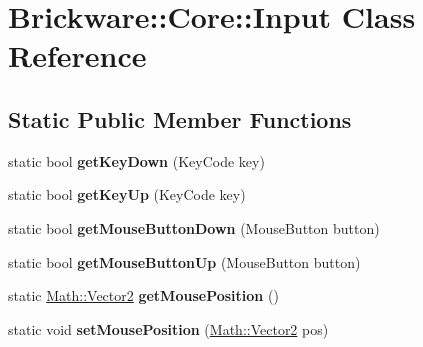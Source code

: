 \hypertarget{classBrickware_1_1Core_1_1Input}{}\section{Brickware\+:\+:Core\+:\+:Input Class Reference}
\label{classBrickware_1_1Core_1_1Input}
\subsection*{Static Public Member Functions}
\begin{DoxyCompactItemize}
\item 
\hypertarget{classBrickware_1_1Core_1_1Input_ab009d6745d772078e0f19ea9720d61b7}{}static bool {\bfseries get\+Key\+Down} (Key\+Code key)\label{classBrickware_1_1Core_1_1Input_ab009d6745d772078e0f19ea9720d61b7}

\item 
\hypertarget{classBrickware_1_1Core_1_1Input_acadd3c6ef414d2826d9e0a0cc05f0926}{}static bool {\bfseries get\+Key\+Up} (Key\+Code key)\label{classBrickware_1_1Core_1_1Input_acadd3c6ef414d2826d9e0a0cc05f0926}

\item 
\hypertarget{classBrickware_1_1Core_1_1Input_af6bb3c6985cdb2646f82bec45f010880}{}static bool {\bfseries get\+Mouse\+Button\+Down} (Mouse\+Button button)\label{classBrickware_1_1Core_1_1Input_af6bb3c6985cdb2646f82bec45f010880}

\item 
\hypertarget{classBrickware_1_1Core_1_1Input_a6db20f0ba2dcd158a210eea12e04ff79}{}static bool {\bfseries get\+Mouse\+Button\+Up} (Mouse\+Button button)\label{classBrickware_1_1Core_1_1Input_a6db20f0ba2dcd158a210eea12e04ff79}

\item 
\hypertarget{classBrickware_1_1Core_1_1Input_ada65d73a18226652a1b8330addf35e8a}{}static \hyperlink{classBrickware_1_1Math_1_1Vector2}{Math\+::\+Vector2} {\bfseries get\+Mouse\+Position} ()\label{classBrickware_1_1Core_1_1Input_ada65d73a18226652a1b8330addf35e8a}

\item 
\hypertarget{classBrickware_1_1Core_1_1Input_ac75abf7b5550242bac09cf2831720d48}{}static void {\bfseries set\+Mouse\+Position} (\hyperlink{classBrickware_1_1Math_1_1Vector2}{Math\+::\+Vector2} pos)\label{classBrickware_1_1Core_1_1Input_ac75abf7b5550242bac09cf2831720d48}

\end{DoxyCompactItemize}
